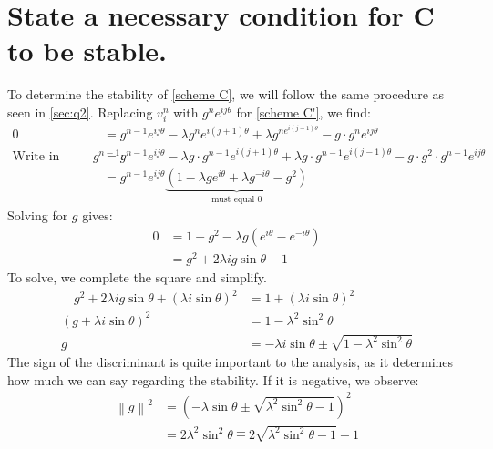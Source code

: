 \documentclass{math_hw}
\theoremstyle{definition}
\begin{document}
    \section{{State a necessary condition for \textbf{C} to be stable.}} \label{sec:q3}
    To determine the stability of \cref{scheme C}, we will follow the same procedure as seen in \cref{sec:q2}.
    Replacing $v_i^n$ with $g^n e^{ij\theta}$ for \cref{scheme C'}, we find:
    \begin{equation*}
        \begin{split}
            0&= g^{n-1}e^{ij\theta} -\lambda g^n e^{i(j+1)\theta}+\lambda g^{ne^{i(j-1)\theta}}-g\cdot g^n e^{ij\theta} \\
            \text{Write in terms of $g^{n-1}$:} \quad &=g^{n-1}e^{ij\theta} -\lambda g\cdot g^{n-1} e^{i(j+1)\theta}+\lambda g\cdot g^{n-1}e^{i(j-1)\theta}-g\cdot g^2 \cdot g^{n-1} e^{ij\theta}\\
            &= g^{n-1}e^{ij\theta}\underbrace{\left( 1-\lambda ge^{i\theta}+\lambda g^{-i\theta}-g^2 \right)}_{\text{must equal 0}}
        \end{split}
    \end{equation*}
    Solving for $g$ gives:
    \begin{equation*}
        \begin{split}
            0 &=1-g^2-\lambda g\left( e^{i\theta}-e^{-i\theta} \right) \\
            &=g^2 + 2\lambda ig\sin \theta -1
        \end{split}
    \end{equation*}
    To solve, we complete the square and simplify.
    \begin{equation*}
        \begin{split}
            \quad g^2 + 2\lambda ig\sin \theta +\left( \lambda i\sin \theta \right)^2 &= 1+ \left( \lambda i\sin \theta \right)^2 \\
            \left( g+\lambda i\sin \theta \right)^2 &= 1-\lambda^2\sin ^2 \theta \\
            g &= -\lambda i\sin \theta \pm \sqrt {1-\lambda^2 \sin^2 \theta }
        \end{split}
    \end{equation*}
    The sign of the discriminant is quite important to the analysis, as it determines how much we can say regarding the stability.
    If it is negative, we observe:
    \begin{equation*}
        \begin{split}
            \left\| g \right\|^2 &= \left( -\lambda\sin \theta \pm \sqrt {\lambda^2\sin ^2 \theta -1} \right)^2 \\
            &= 2\lambda^2 \sin ^2\theta \mp 2\sqrt {\lambda^2 \sin^2 \theta -1} -1
        \end{split}
    \end{equation*}
\end{document}

